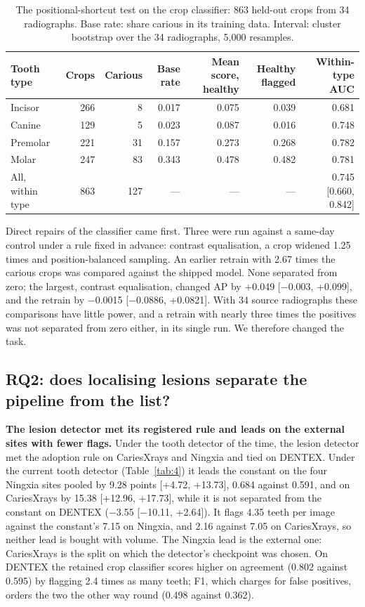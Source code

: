 \documentclass[conference]{IEEEtran}
\begin{document}
\begin{table}[t]
\centering
\caption{The positional-shortcut test on the crop classifier: 863 held-out crops from 34 radiographs. Base rate: share carious in its training data. Interval: cluster bootstrap over the 34 radiographs, 5,000 resamples.}
\label{tab:5}
\footnotesize
\setlength{\tabcolsep}{3pt}
\begin{tabular}{>{\raggedright\arraybackslash}p{5.06cm}rrrrrr}
\toprule
Tooth type & Crops & Carious & Base rate & Mean score, healthy & Healthy flagged & Within-type AUC \\
\midrule
Incisor & 266 & 8 & 0.017 & 0.075 & 0.039 & 0.681 \\
Canine & 129 & 5 & 0.023 & 0.087 & 0.016 & 0.748 \\
Premolar & 221 & 31 & 0.157 & 0.273 & 0.268 & 0.782 \\
Molar & 247 & 83 & 0.343 & 0.478 & 0.482 & 0.781 \\
All, within type & 863 & 127 & — & — & — & 0.745 [0.660, 0.842] \\
\bottomrule
\end{tabular}
\end{table}

Direct repairs of the classifier came first. Three were run against a same-day control under a rule fixed in advance: contrast equalisation, a crop widened 1.25 times and position-balanced sampling. An earlier retrain with 2.67 times the carious crops was compared against the shipped model. None separated from zero; the largest, contrast equalisation, changed AP by +0.049 [$-$0.003, +0.099], and the retrain by $-$0.0015 [$-$0.0886, +0.0821]. With 34 source radiographs these comparisons have little power, and a retrain with nearly three times the positives was not separated from zero either, in its single run. We therefore changed the task.

\subsection{RQ2: does localising lesions separate the pipeline from the list?}

\textbf{The lesion detector met its registered rule and leads on the external sites with fewer flags.} Under the tooth detector of the time, the lesion detector met the adoption rule on CariesXrays and Ningxia and tied on DENTEX. Under the current tooth detector (Table~\ref{tab:4}) it leads the constant on the four Ningxia sites pooled by 9.28 points [+4.72, +13.73], 0.684 against 0.591, and on CariesXrays by 15.38 [+12.96, +17.73], while it is not separated from the constant on DENTEX ($-$3.55 [$-$10.11, +2.64]). It flags 4.35 teeth per image against the constant's 7.15 on Ningxia, and 2.16 against 7.05 on CariesXrays, so neither lead is bought with volume. The Ningxia lead is the external one: CariesXrays is the split on which the detector's checkpoint was chosen. On DENTEX the retained crop classifier scores higher on agreement (0.802 against 0.595) by flagging 2.4 times as many teeth; F1, which charges for false positives, orders the two the other way round (0.498 against 0.362).
\end{document}
